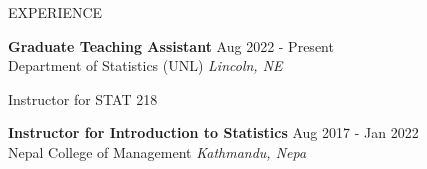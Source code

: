 \documentclass{resume} %
\begin{document}
\begin{rSection}{EXPERIENCE}

\textbf{Graduate Teaching Assistant} \hfill Aug 2022 - Present\\
Department of Statistics (UNL) \hfill \textit{Lincoln, NE}
 \begin{itemize}
     Instructor for STAT 218
 \end{itemize}
 
\textbf{Instructor for Introduction to Statistics} \hfill Aug 2017 - Jan 2022\\
Nepal College of Management \hfill \textit{Kathmandu, Nepa}

\end{rSection} 



\end{document}
